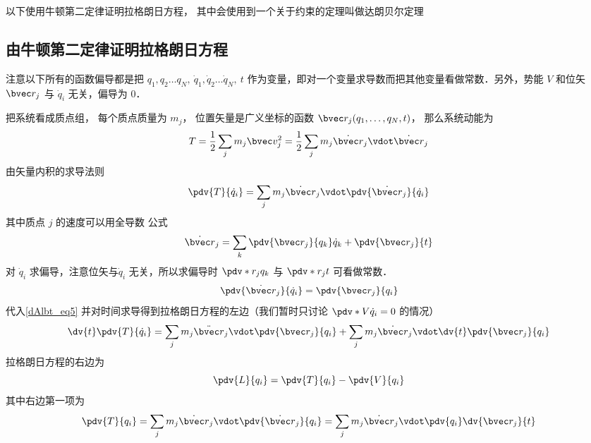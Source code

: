 

以下使用牛顿第二定律证明拉格朗日方程， 其中会使用到一个关于约束的定理叫做达朗贝尔定理

\subsection{由牛顿第二定律证明拉格朗日方程}
注意以下所有的函数偏导都是把 $q_1, q_2\dots q_N,\ \dot q_1, \dot q_2\dots \dot q_N,\ t$ 作为变量，即对一个变量求导数而把其他变量看做常数．另外，势能 $V$ 和位矢 $\bvec r_j$ 与 $\dot q_i$ 无关，偏导为 0．

把系统看成质点组， 每个质点质量为 $m_j$， 位置矢量是广义坐标的函数 $\bvec r_j(q_1,\dots,q_N,t)$， 那么系统动能为
\begin{equation}
T = \frac12 \sum_j m_j \bvec v_j^2 = \frac12 \sum_j m_j \dot{\bvec r}_j \vdot \dot{\bvec r}_j
\end{equation}
由矢量内积的求导法则
\begin{equation}\label{dAlbt_eq5}
\pdv{T}{\dot q_i} = \sum_j m_j \dot{\bvec r}_j \vdot \pdv{\dot{\bvec r}_j}{\dot q_i}
\end{equation}
其中质点 $j$ 的速度可以用全导数 公式
\begin{equation}
\dot{\bvec r}_j = \sum_k \pdv{\bvec r_j}{q_k} \dot q_k  + \pdv{\bvec r_j}{t}
\end{equation}
对 $\dot q_i$ 求偏导，注意位矢与$\dot q_i$ 无关，所以求偏导时 $\pdv*{r_j}{q_k}$ 与 $\pdv*{r_j}{t}$ 可看做常数．
\begin{equation}\label{dAlbt_eq27}
\pdv{\dot{\bvec r}_j}{\dot q_i} = \pdv{\bvec r_j}{q_i}
\end{equation}
代入\autoref{dAlbt_eq5} 并对时间求导得到拉格朗日方程的左边（我们暂时只讨论 $\pdv*{V}{\dot q_i} = 0$ 的情况）
\begin{equation}\label{dAlbt_eq8}
\dv{t} \pdv{T}{\dot q_i} = \sum_j m_j \ddot{\bvec r}_j \vdot \pdv{\bvec r_j}{q_i}  + \sum_j m_j \dot{\bvec r}_j \vdot \dv{t} \pdv{\bvec r_j}{q_i}
\end{equation}
拉格朗日方程的右边为
\begin{equation}
\pdv{L}{q_i} = \pdv{T}{q_i} - \pdv{V}{q_i}
\end{equation}
其中右边第一项为
\begin{equation}\label{dAlbt_eq28}
\pdv{T}{q_i} = \sum_j m_j \dot{\bvec r}_j \vdot \pdv{\dot{\bvec r}_j}{q_i} = \sum_j m_j \dot{\bvec r}_j \vdot \pdv{q_i} \dv{\bvec r_j}{t}
\end{equation}
